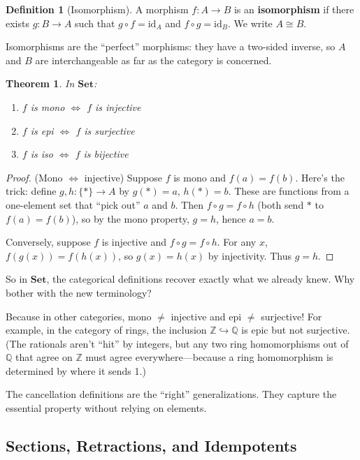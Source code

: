\documentclass[11pt]{article}
\newcommand{\Z}{\mathbb{Z}}
\newcommand{\Q}{\mathbb{Q}}
\newcommand{\cat}[1]{\mathbf{#1}}
\newcommand{\Set}{\cat{Set}}
\newcommand{\id}{\mathrm{id}}
\theoremstyle{definition}
\newtheorem{definition}{Definition}[section]
\theoremstyle{plain}
\newtheorem{theorem}{Theorem}[section]
\theoremstyle{remark}
\begin{document}
\begin{definition}[Isomorphism]
A morphism $f: A \to B$ is an \textbf{isomorphism} if there exists $g: B \to A$ such that $g \circ f = \id_A$ and $f \circ g = \id_B$. We write $A \cong B$.
\end{definition}

Isomorphisms are the ``perfect'' morphisms: they have a two-sided inverse, so $A$ and $B$ are interchangeable as far as the category is concerned.

\begin{theorem}
In $\Set$:
\begin{enumerate}
  \item $f$ is mono $\iff$ $f$ is injective
  \item $f$ is epi $\iff$ $f$ is surjective
  \item $f$ is iso $\iff$ $f$ is bijective
\end{enumerate}
\end{theorem}

\begin{proof}
(Mono $\iff$ injective) Suppose $f$ is mono and $f(a) = f(b)$. Here's the trick: define $g, h: \{*\} \to A$ by $g(*) = a$, $h(*) = b$. These are functions from a one-element set that ``pick out'' $a$ and $b$. Then $f \circ g = f \circ h$ (both send $*$ to $f(a) = f(b)$), so by the mono property, $g = h$, hence $a = b$.

Conversely, suppose $f$ is injective and $f \circ g = f \circ h$. For any $x$, $f(g(x)) = f(h(x))$, so $g(x) = h(x)$ by injectivity. Thus $g = h$.
\end{proof}

So in $\Set$, the categorical definitions recover exactly what we already knew. Why bother with the new terminology?

\begin{warning}
Because in other categories, mono $\neq$ injective and epi $\neq$ surjective! For example, in the category of rings, the inclusion $\Z \hookrightarrow \Q$ is epic but not surjective. (The rationals aren't ``hit'' by integers, but any two ring homomorphisms out of $\Q$ that agree on $\Z$ must agree everywhere---because a ring homomorphism is determined by where it sends 1.)

The cancellation definitions are the ``right'' generalizations. They capture the essential property without relying on elements.
\end{warning}

\subsection{Sections, Retractions, and Idempotents}
\end{document}
